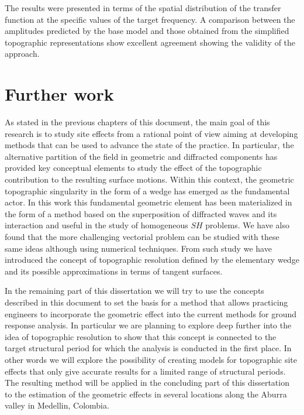 \documentclass[11pt,letterpaper]{article}
\begin{document}
The results were presented in terms of the spatial distribution of the transfer function at the specific values of the target frequency. A comparison between the amplitudes predicted by the base model and those obtained from the simplified topographic representations show excellent agreement showing the validity of the approach.


\newpage
\section*{Further work}
{}
As stated in the previous chapters of this document, the main goal of this research is to study site effects from a rational point of view aiming at developing methods that can be used to advance the state of the practice. In particular, the alternative partition of the field in geometric and diffracted components has provided key conceptual elements to study the effect of the topographic contribution to the resulting surface motions. Within this context, the geometric topographic singularity in the form of a wedge has emerged as the fundamental actor. In this work this fundamental geometric element has been materialized in the form of a method based on the superposition of diffracted waves and its interaction and useful in the study of homogeneous $SH$ problems. We have also found that the more challenging vectorial problem can be studied with these same ideas although using numerical techniques. From such study we have introduced the concept of topographic resolution defined by the elementary wedge and its possible approximations in terms of tangent surfaces.

In the remaining part of this dissertation we will try to use the concepts described in this document to set the basis for a method that allows practicing engineers to incorporate the geometric effect into the current methods for ground response analysis. In particular we are planning to explore deep further into the idea of topographic resolution to show that this concept is connected to the target structural period for which the analysis is conducted in the first place. In other words we will explore the possibility of creating models for topographic site effects that only give accurate results for a limited range of structural periods. The resulting method will be applied in the concluding part of this dissertation to the estimation of the geometric effects in several locations along the Aburra valley in Medellin, Colombia.
\end{document}
